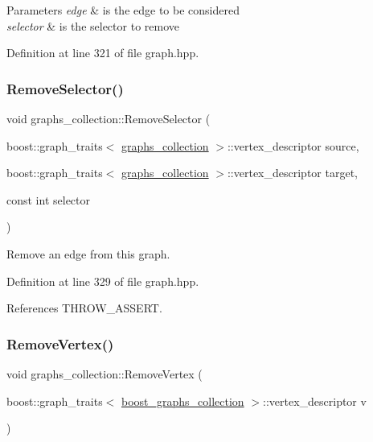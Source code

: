 \begin{DoxyParams}{Parameters}
{\em edge} & is the edge to be considered \\
\hline
{\em selector} & is the selector to remove \\
\hline
\end{DoxyParams}


Definition at line 321 of file graph.\+hpp.

\mbox{\label{structgraphs__collection_af02a53bb6770a754273f196c949ae2e5}} 
\subsubsection{\texorpdfstring{Remove\+Selector()}{RemoveSelector()}\hspace{0.1cm}{\footnotesize\ttfamily [3/3]}}
{\footnotesize\ttfamily void graphs\+\_\+collection\+::\+Remove\+Selector (\begin{DoxyParamCaption}\item[{boost\+::graph\+\_\+traits$<$ \hyperlink{structgraphs__collection}{graphs\+\_\+collection} $>$\+::vertex\+\_\+descriptor}]{source,  }\item[{boost\+::graph\+\_\+traits$<$ \hyperlink{structgraphs__collection}{graphs\+\_\+collection} $>$\+::vertex\+\_\+descriptor}]{target,  }\item[{const int}]{selector }\end{DoxyParamCaption})\hspace{0.3cm}{\ttfamily [inline]}}



Remove an edge from this graph. 



Definition at line 329 of file graph.\+hpp.



References T\+H\+R\+O\+W\+\_\+\+A\+S\+S\+E\+RT.

\mbox{\label{structgraphs__collection_abf3690c3dab1f860b7b0a520b59d0e01}} 
\subsubsection{\texorpdfstring{Remove\+Vertex()}{RemoveVertex()}}
{\footnotesize\ttfamily void graphs\+\_\+collection\+::\+Remove\+Vertex (\begin{DoxyParamCaption}\item[{boost\+::graph\+\_\+traits$<$ \hyperlink{graph_8hpp_a315f0e4c95fedf30b91945ed29d42332}{boost\+\_\+graphs\+\_\+collection} $>$\+::vertex\+\_\+descriptor}]{v }\end{DoxyParamCaption})\hspace{0.3cm}{\ttfamily [virtual]}}



